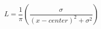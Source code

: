 \documentclass[10pt]{article}
\begin{document}
\[L = \frac{1}{\pi} \left( \frac{\sigma}{(x - center)^2 + \sigma^2}\right)
\]
\end{document}

